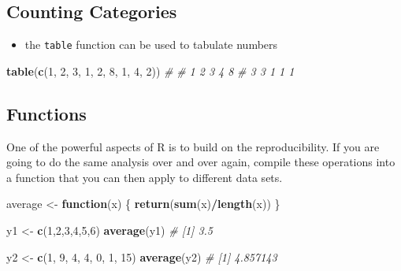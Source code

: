 \documentclass[]{article}
\newenvironment{Shaded}{\begin{snugshade}}{\end{snugshade}}
\newcommand{\CommentTok}[1]{\textcolor[rgb]{0.56,0.35,0.01}{\textit{#1}}}
\newcommand{\ControlFlowTok}[1]{\textcolor[rgb]{0.13,0.29,0.53}{\textbf{#1}}}
\newcommand{\DecValTok}[1]{\textcolor[rgb]{0.00,0.00,0.81}{#1}}
\newcommand{\KeywordTok}[1]{\textcolor[rgb]{0.13,0.29,0.53}{\textbf{#1}}}
\newcommand{\NormalTok}[1]{#1}
\newcommand{\OperatorTok}[1]{\textcolor[rgb]{0.81,0.36,0.00}{\textbf{#1}}}
\newcommand{\StringTok}[1]{\textcolor[rgb]{0.31,0.60,0.02}{#1}}
\providecommand{\tightlist}{%
  \setlength{\itemsep}{0pt}\setlength{\parskip}{0pt}}
\begin{document}
\hypertarget{counting-categories}{%
\subsection{Counting Categories}\label{counting-categories}}

\begin{itemize}
\tightlist
\item
  the \texttt{table} function can be used to tabulate numbers
\end{itemize}

\begin{Shaded}
\begin{Highlighting}[]
\KeywordTok{table}\NormalTok{(}\KeywordTok{c}\NormalTok{(}\DecValTok{1}\NormalTok{, }\DecValTok{2}\NormalTok{, }\DecValTok{3}\NormalTok{, }\DecValTok{1}\NormalTok{, }\DecValTok{2}\NormalTok{, }\DecValTok{8}\NormalTok{, }\DecValTok{1}\NormalTok{, }\DecValTok{4}\NormalTok{, }\DecValTok{2}\NormalTok{))}
\CommentTok{# }
\CommentTok{# 1 2 3 4 8 }
\CommentTok{# 3 3 1 1 1}
\end{Highlighting}
\end{Shaded}

\hypertarget{functions}{%
\subsection{Functions}\label{functions}}

One of the powerful aspects of R is to build on the reproducibility. If
you are going to do the same analysis over and over again, compile these
operations into a function that you can then apply to different data
sets.

\begin{Shaded}
\begin{Highlighting}[]
\NormalTok{average <-}\StringTok{ }\ControlFlowTok{function}\NormalTok{(x)}
\NormalTok{\{}
  \KeywordTok{return}\NormalTok{(}\KeywordTok{sum}\NormalTok{(x)}\OperatorTok{/}\KeywordTok{length}\NormalTok{(x))}
\NormalTok{\}}

\NormalTok{y1 <-}\StringTok{ }\KeywordTok{c}\NormalTok{(}\DecValTok{1}\NormalTok{,}\DecValTok{2}\NormalTok{,}\DecValTok{3}\NormalTok{,}\DecValTok{4}\NormalTok{,}\DecValTok{5}\NormalTok{,}\DecValTok{6}\NormalTok{)}
\KeywordTok{average}\NormalTok{(y1)}
\CommentTok{# [1] 3.5}

\NormalTok{y2 <-}\StringTok{ }\KeywordTok{c}\NormalTok{(}\DecValTok{1}\NormalTok{, }\DecValTok{9}\NormalTok{, }\DecValTok{4}\NormalTok{, }\DecValTok{4}\NormalTok{, }\DecValTok{0}\NormalTok{, }\DecValTok{1}\NormalTok{, }\DecValTok{15}\NormalTok{)}
\KeywordTok{average}\NormalTok{(y2)}
\CommentTok{# [1] 4.857143}
\end{Highlighting}
\end{Shaded}
\end{document}
